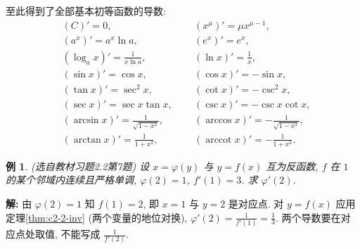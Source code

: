 \documentclass[UTF8,openany]{ctexbook}
\theoremstyle{chinesetextbook}
\newtheorem{example}{例}[section]
\newenvironment{cnsolution}{\par\indent\textbf{解:} \ignorespaces}{\par}
\begin{document}
至此得到了全部基本初等函数的导数:
\[
\begin{aligned}
&(C)'=0, &&(x^\mu)'=\mu x^{\mu-1},\\
&(a^x)'=a^x\ln a, &&(e^x)'=e^x,\\
&(\log_ax)'=\frac1{x\ln a}, &&(\ln x)'=\frac1x,\\
&(\sin x)'=\cos x, &&(\cos x)'=-\sin x,\\
&(\tan x)'=\sec^2x, &&(\cot x)'=-\csc^2x,\\
&(\sec x)'=\sec x\tan x, &&(\csc x)'=-\csc x\cot x,\\
&(\arcsin x)'=\frac1{\sqrt{1-x^2}}, &&(\arccos x)'=-\frac1{\sqrt{1-x^2}},\\
&(\arctan x)'=\frac1{1+x^2},\qquad &&(\operatorname{arccot}x)'=-\frac1{1+x^2}.
\end{aligned}
\]
\begin{example}\label{ex:c2-h2-7}
\textnormal{(选自教材习题2.2第7题)} 设 $x=\varphi(y)$ 与 $y=f(x)$ 互为反函数, $f$ 在 $1$ 的某个邻域内连续且严格单调, $\varphi(2)=1$, $f'(1)=3$. 求 $\varphi'(2)$.
\end{example}
\begin{cnsolution}
由 $\varphi(2)=1$ 知 $f(1)=2$, 即 $x=1$ 与 $y=2$ 是对应点. 对 $y=f(x)$ 应用定理\ref{thm:c2-2-inv} (两个变量的地位对换), $\displaystyle\varphi'(2)=\frac1{f'(1)}=\frac13$. 两个导数要在对应点处取值, 不能写成 $\displaystyle\frac1{f'(2)}$.
\end{cnsolution}
\end{document}

